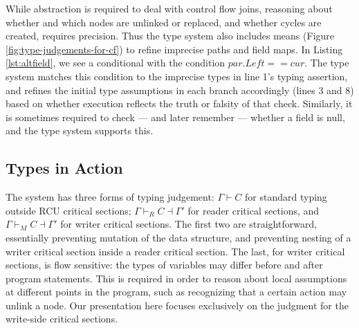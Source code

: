 While abstraction is required to deal with control flow joins, reasoning about whether and which nodes are unlinked or replaced, and whether cycles are created, requires precision.  Thus the type system also includes means (Figure \ref{fig:type-judgements-for-cf}) to refine imprecise paths and field maps.
%
In Listing \ref{lst:altfield}, we see a conditional with the condition $par.Left == cur$. The type system matches this condition to the imprecise types in line 1's typing assertion, and refines the initial type assumptions in each branch accordingly (lines 3 and 8) based on whether execution reflects the truth or falsity of that check.
Similarly, it is sometimes required to check --- and later remember --- whether  a field is null, and the type system supports this.
\subsection{Types in Action}
\label{subsection:type-action}

The system has three forms of typing judgement: 
$\Gamma \vdash C$ for standard typing outside RCU critical sections; 
$\Gamma \vdash_R C \dashv \Gamma'$ for reader critical sections, and
$\Gamma \vdash_M C \dashv \Gamma'$ for writer critical sections.
The first two are straightforward, essentially preventing mutation of the data structure, and preventing nesting of a writer critical section inside a reader critical section.
The last, for writer critical sections, is flow sensitive: the types of variables may differ before and after program statements.  This is required in order to reason about local assumptions at different points in the program, such as recognizing that a certain action may unlink a node.
Our presentation here focuses exclusively on the judgment for the write-side critical sections.


